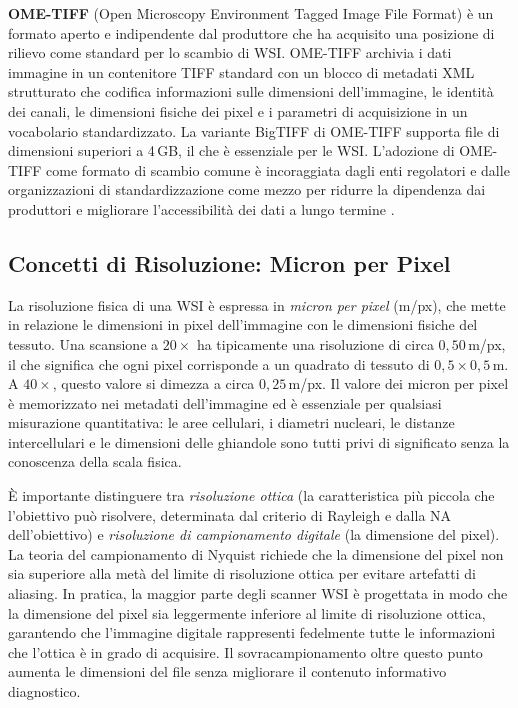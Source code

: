 \textbf{OME-TIFF} (Open Microscopy Environment Tagged Image File Format) è un formato aperto e indipendente dal produttore che ha acquisito una posizione di rilievo come standard per lo scambio di WSI. OME-TIFF archivia i dati immagine in un contenitore TIFF standard con un blocco di metadati XML strutturato che codifica informazioni sulle dimensioni dell'immagine, le identità dei canali, le dimensioni fisiche dei pixel e i parametri di acquisizione in un vocabolario standardizzato. La variante BigTIFF di OME-TIFF supporta file di dimensioni superiori a 4\,GB, il che è essenziale per le WSI. L'adozione di OME-TIFF come formato di scambio comune è incoraggiata dagli enti regolatori e dalle organizzazioni di standardizzazione come mezzo per ridurre la dipendenza dai produttori e migliorare l'accessibilità dei dati a lungo termine \cite{song2023}.

\subsection{Concetti di Risoluzione: Micron per Pixel}

La risoluzione fisica di una WSI è espressa in \emph{micron per pixel} (\textmu m/px), che mette in relazione le dimensioni in pixel dell'immagine con le dimensioni fisiche del tessuto. Una scansione a $20\times$ ha tipicamente una risoluzione di circa $0{,}50$\,\textmu m/px, il che significa che ogni pixel corrisponde a un quadrato di tessuto di $0{,}5 \times 0{,}5$\,\textmu m. A $40\times$, questo valore si dimezza a circa $0{,}25$\,\textmu m/px. Il valore dei micron per pixel è memorizzato nei metadati dell'immagine ed è essenziale per qualsiasi misurazione quantitativa: le aree cellulari, i diametri nucleari, le distanze intercellulari e le dimensioni delle ghiandole sono tutti privi di significato senza la conoscenza della scala fisica.

È importante distinguere tra \emph{risoluzione ottica} (la caratteristica più piccola che l'obiettivo può risolvere, determinata dal criterio di Rayleigh e dalla NA dell'obiettivo) e \emph{risoluzione di campionamento digitale} (la dimensione del pixel). La teoria del campionamento di Nyquist richiede che la dimensione del pixel non sia superiore alla metà del limite di risoluzione ottica per evitare artefatti di aliasing. In pratica, la maggior parte degli scanner WSI è progettata in modo che la dimensione del pixel sia leggermente inferiore al limite di risoluzione ottica, garantendo che l'immagine digitale rappresenti fedelmente tutte le informazioni che l'ottica è in grado di acquisire. Il sovracampionamento oltre questo punto aumenta le dimensioni del file senza migliorare il contenuto informativo diagnostico.

